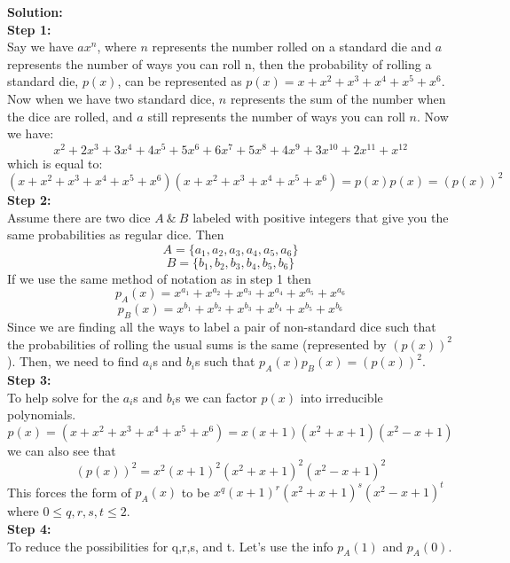 \documentclass[10pt,a4paper]{report}
\begin{document}
	\newline
	\textbf{Solution: }\\
	\newline
	\textbf{Step 1:}\\
	Say we have $ax^n$, where $n$ represents the number rolled on a standard die and $a$ represents the number of ways you can roll n, then the probability of rolling a standard die, $p(x)$, can be represented as $p(x) = x + x^2 + x^3 + x^4 + x^5 + x^6$.\\
	Now when we have two standard dice, $n$ represents the sum of the number when the dice are rolled, and $a$ still represents the number of ways you can roll $n$.  Now we have:\\
	\[x^2 + 2x^3 + 3x^4 + 4x^5 + 5x^6 + 6x^7 + 5x^8 + 4x^9 + 3x^{10} + 2x^{11} + x^{12} \]
	which is equal to:\\
	\[(x + x^2 + x^3 + x^4 + x^5 + x^6)(x + x^2 + x^3 + x^4 + x^5 + x^6) = p(x)p(x) = (p(x))^2 \]
	\newline
	\textbf{Step 2:}\\
	Assume there are two dice $A\ \&\ B$ labeled with positive integers that give you the same probabilities as regular dice.  Then \[A = \{a_1, a_2, a_3, a_4, a_5, a_6 \}\]
	\[B = \{b_1, b_2, b_3, b_4, b_5, b_6 \}\]
	If we use the same method of notation as in step 1 then
	\[p_A(x) = x^{a_1} + x^{a_2} + x^{a_3} + x^{a_4} + x^{a_5} + x^{a_6}\]
	\[p_B(x) = x^{b_1} + x^{b_2} + x^{b_3} + x^{b_4} + x^{b_5} + x^{b_6} \]
	Since we are finding all the ways to label a pair of non-standard dice such that the probabilities of rolling the usual sums is the same (represented by $(p(x))^2$).  Then, we need to find $a_i$s and $b_i$s such that $p_A(x)p_B(x) = (p(x))^2$.\\
	\newline
	\textbf{Step 3:}\\
	To help solve for the $a_i$s and $b_i$s we can factor $p(x)$ into irreducible polynomials.
	\[p(x) = (x + x^2 + x^3 + x^4 + x^5 + x^6) = x(x+1)(x^2 + x + 1)(x^2 - x + 1) \]
	we can also see that\\
	\[(p(x))^2 = x^2(x+1)^2(x^2 + x + 1)^2(x^2 - x + 1)^2 \]
	This forces the form of $p_A(x)$ to be $x^q(x+1)^r(x^2+x+1)^s(x^2-x+1)^t$ where $0\leq q,r,s,t\leq2$.\\
	\newline
	\textbf{Step 4:}\\
	To reduce the possibilities for q,r,s, and t. Let's use the info $p_A(1)$ and $p_A(0)$.\\
\end{document}
